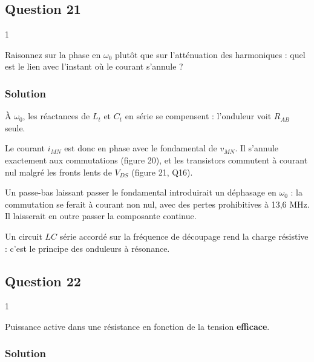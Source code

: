 \documentclass[11pt,a4paper]{article}
\begin{document}
\hypertarget{question-21}{%
\subsection{Question 21}\label{question-21}}

\begin{indication}{1}

Raisonnez sur la phase en \(\omega_0\) plutôt que sur l'atténuation des harmoniques : quel est le lien avec l'instant où le courant s'annule ?

\end{indication}

\hypertarget{solution-20}{%
\subsubsection{Solution}\label{solution-20}}

À \(\omega_0\), les réactances de \(L_t\) et \(C_t\) en série se compensent : l'onduleur voit \(R_{AB}\) seule.

Le courant \(i_{MN}\) est donc en phase avec le fondamental de \(v_{MN}\). Il s'annule exactement aux commutations (figure 20), et les transistors commutent à courant nul malgré les fronts lents de \(V_{DS}\) (figure 21, Q16).

Un passe-bas laissant passer le fondamental introduirait un déphasage en \(\omega_0\) : la commutation se ferait à courant non nul, avec des pertes prohibitives à 13,6 MHz. Il laisserait en outre passer la composante continue.

\begin{methode}

Un circuit \(LC\) série accordé sur la fréquence de découpage rend la charge résistive : c'est le principe des onduleurs à résonance.

\end{methode}

\hypertarget{question-22}{%
\subsection{Question 22}\label{question-22}}

\begin{indication}{1}

Puissance active dans une résistance en fonction de la tension \textbf{efficace}.

\end{indication}

\hypertarget{solution-21}{%
\subsubsection{Solution}\label{solution-21}}
\end{document}
